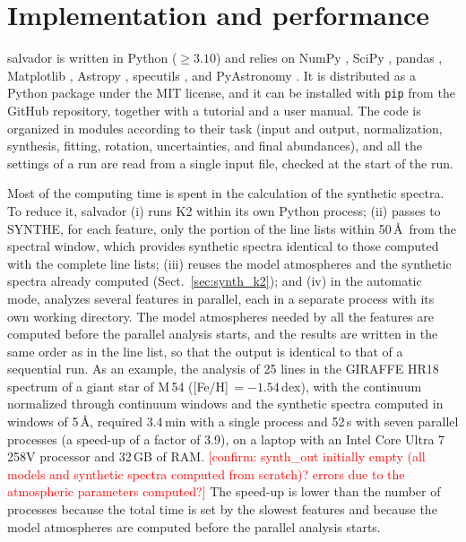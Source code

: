 \documentclass{aa}
\newcommand{\todo}[1]{\textcolor{red}{[#1]}}
\newcommand{\salvador}{salvador}   %
\begin{document}
\section{Implementation and performance}
\label{sec:implementation}

\salvador{} is written in Python ($\geq3.10$) and relies on NumPy
\citep{Harris2020}, SciPy \citep{Virtanen2020}, pandas
\citep{McKinney2010}, Matplotlib \citep{Hunter2007}, Astropy
\citep{Astropy2013, Astropy2018, Astropy2022}, specutils
\citep{Specutils}, and PyAstronomy \citep{Czesla2019}. It is
distributed as a Python package under the MIT license, and it can be
installed with \texttt{pip} from the GitHub repository, together with
a tutorial and a user manual. The code is organized in modules
according to their task (input and output, normalization, synthesis,
fitting, rotation, uncertainties, and final abundances), and all the
settings of a run are read from a single input file, checked at the
start of the run.

Most of the computing time is spent in the calculation of the
synthetic spectra. To reduce it, \salvador{} (i) runs K2 within its own
Python process; (ii) passes to SYNTHE, for each feature, only the
portion of the line lists within 50\,\AA\ from the spectral window,
which provides synthetic spectra identical to those computed with the
complete line lists; (iii) reuses the model atmospheres and the
synthetic spectra already computed (Sect.~\ref{sec:synth_k2}); and
(iv) in the automatic mode, analyzes several features in parallel,
each in a separate process with its own working directory. The model
atmospheres needed by all the features are computed before the parallel
analysis starts, and the results are written in the same order as in
the line list, so that the output is identical to that of a sequential
run. As an example, the analysis of 25 lines in the GIRAFFE HR18
spectrum of a giant star of M\,54 ([Fe/H]$\,=-1.54$\,dex), with the
continuum normalized through continuum windows and the synthetic
spectra computed in windows of 5\,\AA, required 3.4\,min with a single
process and 52\,s with seven parallel processes (a speed-up of a
factor of 3.9), on a laptop with an Intel Core Ultra 7 258V processor
and 32\,GB of RAM. \todo{confirm: synth\_out initially empty (all
models and synthetic spectra computed from scratch)? errors due to the
atmospheric parameters computed?} The speed-up is lower than the number
of processes because the total time is set by the slowest features and
because the model atmospheres are computed before the parallel analysis
starts.
\end{document}
